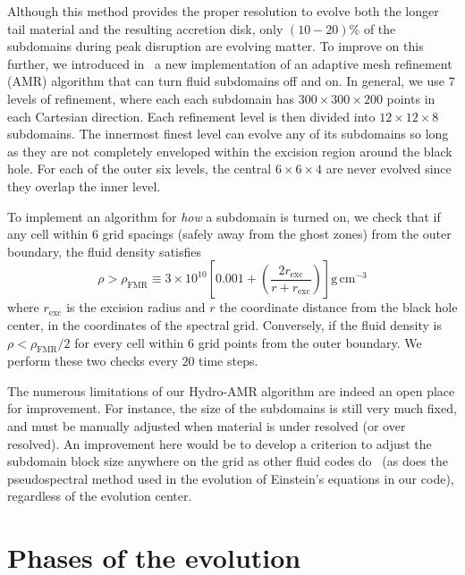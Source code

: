 Although this method provides the proper resolution to evolve both the longer tail material and the resulting accretion disk, only $\left(10 - 20\right) \%$ of the subdomains during peak disruption are evolving matter.  
To improve on this further, we introduced in\mbox{~\cite{FoucartDD2:2017}} a new implementation of an adaptive mesh refinement (AMR) algorithm that can turn  fluid subdomains off and on.
In general, we use $7$ levels of refinement, where each each subdomain has $300 \times 300 \times 200$ points in each Cartesian direction.
Each refinement level is then divided into $12 \times 12 \times 8$ subdomains.
The innermost finest level can evolve any of its subdomains so long as they are not completely enveloped within the excision region around the black hole.
For each of the outer six levels, the central $6 \times 6 \times 4$ are never evolved since they overlap the inner level.

To implement an algorithm for \textit{how} a subdomain is turned on, we check that if any cell within $6$ grid spacings (safely away from the ghost zones) from the outer boundary, the fluid density satisfies 
\begin{equation}
\rho > \rho_\textrm{FMR} 
	\equiv 3 \times 10^{10}\left[0.001 
	+ \left( \frac{2 r_\textrm{exc}}{r+r_\textrm{exc}} \right)
	\right] \textrm{g}\,\textrm{cm}^{-3}
\end{equation}
where $r_\textrm{exc}$ is the excision radius and $r$ the coordinate distance from the black hole center, in the coordinates of the spectral grid.
Conversely, if the fluid density is $\rho < \rho_\textrm{FMR} / 2$ for every cell within $6$ grid points from the outer boundary.
We perform these two checks every $20$ time steps.

The numerous limitations of our Hydro-AMR algorithm are indeed an open place for improvement.  For instance, the size of the subdomains is still very much fixed, and must be manually adjusted when material is under resolved (or over resolved).  An improvement here would be to develop a criterion to adjust the subdomain block size anywhere on the grid as other fluid codes do~\cite{YamamotoShibata2008} (as does the pseudospectral method used in the evolution of Einstein's equations in our code), regardless of the evolution center.  

\section{Phases of the evolution}
\label{sec:epochs}

